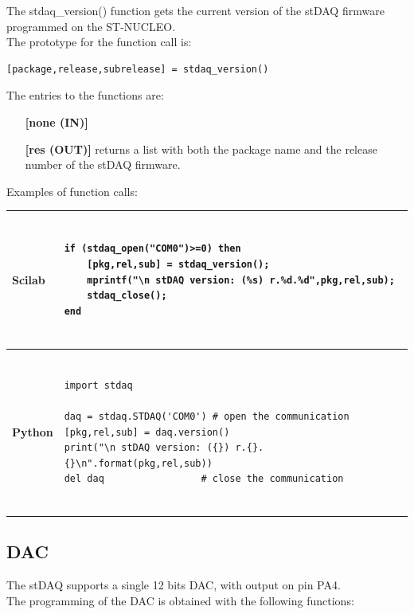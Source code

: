 \documentclass[letterpaper,10pt,english]{hitec}
\begin{document}
The stdaq\_version() function gets the current version of the stDAQ firmware programmed on the ST-NUCLEO. \\
The prototype for the function call is:
\begin{verbatim}
[package,release,subrelease] = stdaq_version()
\end{verbatim}
The entries to the functions are:
\begin{itemize}
\item [\textbf{[none (IN)]}] 
\item [\textbf{[res (OUT)]}] returns a list with both the package name and the release number of the stDAQ firmware.
\end{itemize}
Examples of function calls:
\begin{table}[h!]
\begin{tabular}{|l|l|}
\hline
\cellcolor[HTML]{C0C0C0} \textbf{Scilab} & 
\begin{minipage}{4.5in}
\begin{verbatim}

if (stdaq_open("COM0")>=0) then 
    [pkg,rel,sub] = stdaq_version();
    mprintf("\n stDAQ version: (%s) r.%d.%d",pkg,rel,sub);
    stdaq_close();
end
    
\end{verbatim}
\end{minipage}
\\ \hline
\cellcolor[HTML]{C0C0C0} \textbf{Python} & 
\begin{minipage}{4.5in}
\begin{verbatim}

import stdaq

daq = stdaq.STDAQ('COM0') # open the communication
[pkg,rel,sub] = daq.version()
print("\n stDAQ version: ({}) r.{}.{}\n".format(pkg,rel,sub))
del daq                 # close the communication
    
\end{verbatim}
\end{minipage}
\\ \hline
\end{tabular}
\end{table}

\newpage

\subsection{DAC}

The stDAQ supports a single 12 bits DAC, with output on pin PA4. \\
The programming of the DAC is obtained with the following functions:
\end{document}
